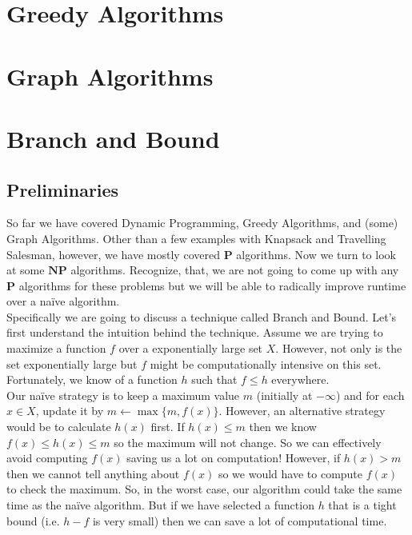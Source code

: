 \documentclass[11pt]{article}
\theoremstyle{plain}
\theoremstyle{definition}
\numberwithin{equation}{section}
\numberwithin{figure}{section}
\begin{document}
\newpage
\section{Greedy Algorithms}

\newpage
\section{Graph Algorithms}

\newpage
\section{Branch and Bound}

\subsection{Preliminaries}
So far we have covered Dynamic Programming, Greedy Algorithms, and (some) Graph Algorithms. Other than a few examples with Knapsack and Travelling Salesman, however, we have mostly covered $\textbf{P}$ algorithms. Now we turn to look at some $\textbf{NP}$ algorithms. Recognize, that, we are not going to come up with any $\textbf{P}$ algorithms for these problems but we will be able to radically improve runtime over a na\"ive algorithm. \\

\noindent Specifically we are going to discuss a technique called Branch and Bound. Let's first understand the intuition behind the technique. Assume we are trying to maximize a function $f$ over a exponentially large set $X$. However, not only is the set exponentially large but $f$ might be computationally intensive on this set. Fortunately, we know of a function $h$ such that $f \leq h$ everywhere. \\

\noindent Our na\"ive strategy is to keep a maximum value $m$ (initially at $-\infty$) and for each $x \in X$, update it by $m \leftarrow \max \{m, f(x)\}$. However, an alternative strategy would be to calculate $h(x)$ first. If $h(x) \leq m$ then we know $f(x) \leq h(x) \leq m$ so the maximum will not change. So we can effectively avoid computing $f(x)$ saving us a lot on computation! However, if $h(x) > m$ then we cannot tell anything about $f(x)$ so we would have to compute $f(x)$ to check the maximum. So, in the worst case, our algorithm could take the same time as the na\"ive algorithm. But if we have selected a function $h$ that is a tight bound (i.e. $h - f$ is very small) then we can save a lot of computational time. \\
\end{document}
